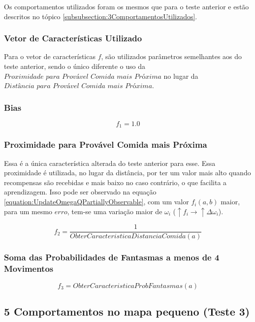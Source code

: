 Os comportamentos utilizados foram os mesmos que para o teste anterior e estão descritos no tópico \ref{subsubsection:3ComportamentosUtilizados}.

\subsubsection{Vetor de Características Utilizado}

Para o vetor de características $ f $, são utilizados parâmetros semelhantes aos do teste anterior, sendo o único diferente o uso da $ \textit{Proximidade para Provável Comida mais Próxima} $ no lugar da $ \textit{Distância para Provável Comida mais Próxima} $.

\subsubsection*{Bias}

$$ f_1 = 1.0 $$

\subsubsection*{Proximidade para Provável Comida mais Próxima}

Essa é a única característica alterada do teste anterior para esse. Essa proximidade é utilizada, no lugar da distância, por ter um valor mais alto quando recompensas são recebidas e mais baixo no caso contrário, o que facilita a aprendizagem. Isso pode ser observado na equação \ref{equation:UpdateOmegaQPartiallyObservable}, com um valor $ f_i \left( a, b \right) $ maior, para um mesmo $ erro $, tem-se uma variação maior de $ \omega_i $ ($ \uparrow f_i \rightarrow \uparrow \Delta \omega_i $).

$$ f_2 = \frac{1}{ObterCaracteristicaDistanciaComida \left( a \right) } $$

\subsubsection*{Soma das Probabilidades de Fantasmas a menos de 4 Movimentos}

$$ f_3 = ObterCaracteristicaProbFantasmas \left( a \right) $$

\subsection{5 Comportamentos no mapa pequeno (Teste 3)} \label{subsection:5ComportamentosMapaPequeno}

